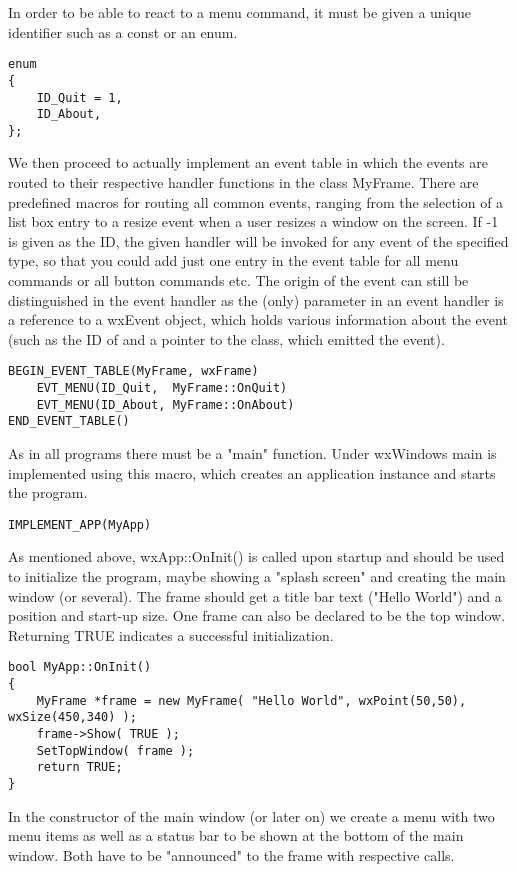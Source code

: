 In order to be able to react to a menu command, it must be given a unique
identifier such as a const or an enum.

\begin{verbatim}
enum
{
    ID_Quit = 1,
    ID_About,
};
\end{verbatim}

We then proceed to actually implement an event table in which the events
are routed to their respective handler functions in the class MyFrame.
There are predefined macros for routing all common events, ranging from
the selection of a list box entry to a resize event when a user resizes
a window on the screen. If -1 is given as the ID, the given handler will be
invoked for any event of the specified type, so that you could add just
one entry in the event table for all menu commands or all button commands etc.
The origin of the event can still be distinguished in the event handler as
the (only) parameter in an event handler is a reference to a wxEvent object,
which holds various information about the event (such as the ID of and a
pointer to the class, which emitted the event).

\begin{verbatim}
BEGIN_EVENT_TABLE(MyFrame, wxFrame)
    EVT_MENU(ID_Quit,  MyFrame::OnQuit)
    EVT_MENU(ID_About, MyFrame::OnAbout)
END_EVENT_TABLE()
\end{verbatim}

As in all programs there must be a "main" function. Under wxWindows main is implemented
using this macro, which creates an application instance and starts the program.

\begin{verbatim}
IMPLEMENT_APP(MyApp)
\end{verbatim}

As mentioned above, wxApp::OnInit() is called upon startup and should be
used to initialize the program, maybe showing a "splash screen" and creating
the main window (or several). The frame should get a title bar text ("Hello World")
and a position and start-up size. One frame can also be declared to be the
top window. Returning TRUE indicates a successful initialization.

\begin{verbatim}
bool MyApp::OnInit()
{
    MyFrame *frame = new MyFrame( "Hello World", wxPoint(50,50), wxSize(450,340) );
    frame->Show( TRUE );
    SetTopWindow( frame );
    return TRUE;
}
\end{verbatim}

In the constructor of the main window (or later on) we create a menu with two menu 
items as well as a status bar to be shown at the bottom of the main window. Both have 
to be "announced" to the frame with respective calls.

